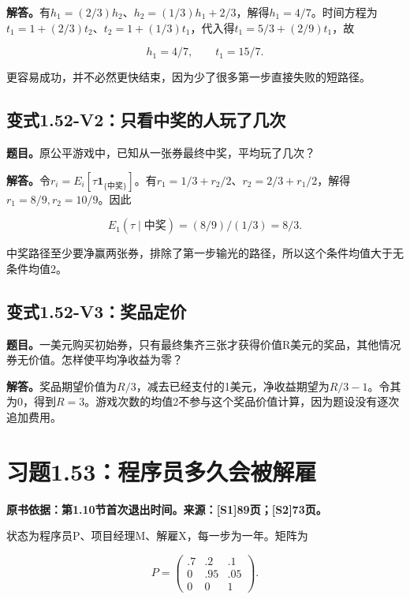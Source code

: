 \documentclass[
  11pt,
  a4paper,
  UTF8,
  fontset=fandol]{ctexart}
\begin{document}
\textbf{解答。}有\(h_1=(2/3)h_2\)、\(h_2=(1/3)h_1+2/3\)，解得\(h_1=4/7\)。时间方程为\(t_1=1+(2/3)t_2\)、\(t_2=1+(1/3)t_1\)，代入得\(t_1=5/3+(2/9)t_1\)，故

\[
\boxed{h_1=4/7,\qquad t_1=15/7.}
\]

更容易成功，并不必然更快结束，因为少了很多第一步直接失败的短路径。

\subsection{变式1.52-V2：只看中奖的人玩了几次}\label{ux53d8ux5f0f1.52-v2ux53eaux770bux4e2dux5956ux7684ux4ebaux73a9ux4e86ux51e0ux6b21}

\textbf{题目。}原公平游戏中，已知从一张券最终中奖，平均玩了几次？

\textbf{解答。}令\(r_i=E_i[\tau\mathbf1_{\{\text{中奖}\}}]\)。有\(r_1=1/3+r_2/2\)、\(r_2=2/3+r_1/2\)，解得\(r_1=8/9,r_2=10/9\)。因此

\[
\boxed{E_1(\tau\mid\text{中奖})=(8/9)/(1/3)=8/3.}
\]

中奖路径至少要净赢两张券，排除了第一步输光的路径，所以这个条件均值大于无条件均值2。

\subsection{变式1.52-V3：奖品定价}\label{ux53d8ux5f0f1.52-v3ux5956ux54c1ux5b9aux4ef7}

\textbf{题目。}一美元购买初始券，只有最终集齐三张才获得价值R美元的奖品，其他情况券无价值。怎样使平均净收益为零？

\textbf{解答。}奖品期望价值为\(R/3\)，减去已经支付的1美元，净收益期望为\(R/3-1\)。令其为0，得到\(\boxed{R=3}\)。游戏次数的均值2不参与这个奖品价值计算，因为题设没有逐次追加费用。

\section{习题1.53：程序员多久会被解雇}\label{ux4e60ux98981.53ux7a0bux5e8fux5458ux591aux4e45ux4f1aux88abux89e3ux96c7}

\textbf{原书依据：第1.10节首次退出时间。来源：{[}S1{]}89页；{[}S2{]}73页。}

状态为程序员P、项目经理M、解雇X，每一步为一年。矩阵为

\[
P=\begin{pmatrix}.7&.2&.1\\0&.95&.05\\0&0&1\end{pmatrix}.
\]
\end{document}

